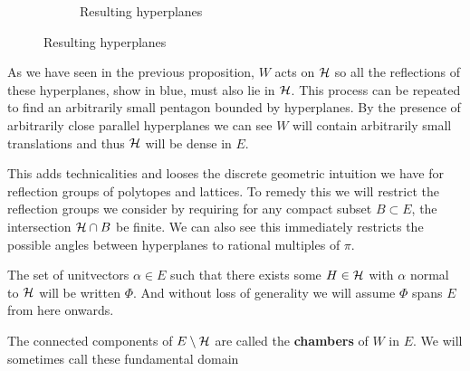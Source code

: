 \documentclass[../main.tex]{subfiles}
\begin{document}
\begin{example}
\begin{figure}[H]
\begin{subfigure}{0.45\textwidth}
        \caption{Resulting hyperplanes}
      \end{subfigure}
    \end{figure}
    As we have seen in the previous proposition, $W$ acts on $\mathcal{H}$ so all the reflections of these hyperplanes, show in blue, must also lie in $\mathcal{H}$. This process can be repeated to find an arbitrarily small pentagon bounded by hyperplanes. By the presence of arbitrarily close parallel hyperplanes we can see $W$ will contain arbitrarily small translations and thus $\mathcal{H}$ will be dense in $E$.
\end{example}

This adds technicalities and looses the discrete geometric intuition we have for reflection groups of polytopes and lattices. To remedy this we will restrict the reflection groups we consider by requiring for any compact subset $B\subset E$, the intersection $\mathcal{H}\cap B$ be finite. We can also see this immediately restricts the possible angles between hyperplanes to rational multiples of $\pi$.

The set of unitvectors $\alpha \in E$ such that there exists some $H\in \mathcal{H}$ with $\alpha$ normal to $\mathcal{H}$ will be written $\Phi$. And without loss of generality we will assume $\Phi$ spans $E$ from here onwards.

\begin{definition}
    The connected components of $E\setminus \mathcal{H}$ are called the \textbf{chambers} of $W$ in $E$. We will sometimes call these fundamental domain
\end{definition}
\end{document}
